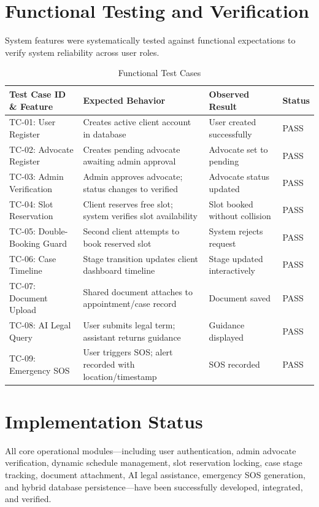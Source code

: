 \documentclass[12pt,a4paper]{report}
\begin{document}
\section{Functional Testing and Verification}
System features were systematically tested against functional expectations to verify system reliability across user roles.

\begin{table}[h!]
    \centering
    \caption{Functional Test Cases}
    \label{tab:test_cases}
    \small
    \begin{tabular}{p{3.5cm} p{5.5cm} p{2.5cm} p{1.8cm}}
        \toprule
        \textbf{Test Case ID \& Feature} & \textbf{Expected Behavior} & \textbf{Observed Result} & \textbf{Status} \\
        \midrule
        TC-01: User Register & Creates active client account in database & User created successfully & PASS \\
        TC-02: Advocate Register & Creates pending advocate awaiting admin approval & Advocate set to pending & PASS \\
        TC-03: Admin Verification & Admin approves advocate; status changes to verified & Advocate status updated & PASS \\
        TC-04: Slot Reservation & Client reserves free slot; system verifies slot availability & Slot booked without collision & PASS \\
        TC-05: Double-Booking Guard & Second client attempts to book reserved slot & System rejects request & PASS \\
        TC-06: Case Timeline & Stage transition updates client dashboard timeline & Stage updated interactively & PASS \\
        TC-07: Document Upload & Shared document attaches to appointment/case record & Document saved & PASS \\
        TC-08: AI Legal Query & User submits legal term; assistant returns guidance & Guidance displayed & PASS \\
        TC-09: Emergency SOS & User triggers SOS; alert recorded with location/timestamp & SOS recorded & PASS \\
        \bottomrule
    \end{tabular}
\end{table}

\section{Implementation Status}
All core operational modules—including user authentication, admin advocate verification, dynamic schedule management, slot reservation locking, case stage tracking, document attachment, AI legal assistance, emergency SOS generation, and hybrid database persistence—have been successfully developed, integrated, and verified.
\end{document}
